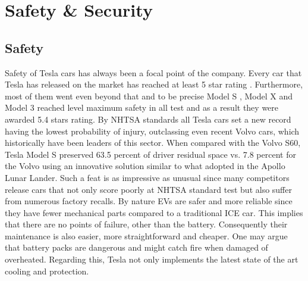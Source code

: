 \documentclass{article} %
\begin{document}




\section{Safety \& Security} %
\subsection{Safety}
Safety of Tesla cars has always been a focal point of the company.
Every car that Tesla has released on the market has reached at least 5 star rating \cite{Safety}.%
Furthermore, most of them went even beyond that and to be precise Model S \cite{ModelS-Rating} , Model X and Model 3 reached level maximum safety in all test and as a result they were awarded 5.4 stars rating.%
By NHTSA standards all Tesla cars set a new record having the lowest probability of injury, outclassing even recent Volvo cars, which historically have been leaders of this sector. When compared with the Volvo S60, Tesla Model S preserved 63.5 percent of driver residual space vs. 7.8 percent for the Volvo using an innovative solution similar to what adopted in the Apollo Lunar Lander.%
Such a feat is as impressive as unusual since many competitors release cars that not only score poorly at NHTSA standard test but also suffer from  numerous factory recalls. 
\newline 
By nature EVs are safer and more reliable since they have fewer mechanical parts compared to a traditional ICE car. This implies that there are no points of failure, other than the battery.%
Consequently their maintenance is also easier, more straightforward and cheaper.%
\newline One may argue that battery packs are dangerous and might catch fire when damaged of overheated. Regarding this, Tesla not only implements the latest state of the art cooling and protection.%
\end{document}
